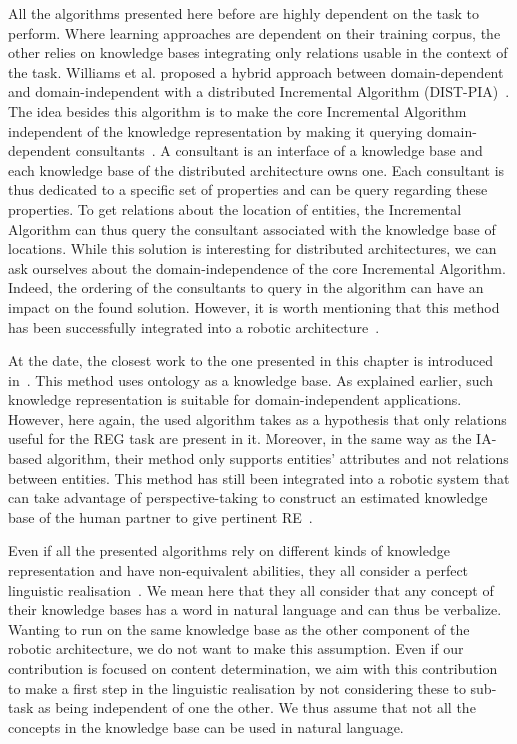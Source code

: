 All the algorithms presented here before are highly dependent on the task to perform. Where learning approaches are dependent on their training corpus, the other relies on knowledge bases integrating only relations usable in the context of the task. Williams et al. proposed a hybrid approach between domain-dependent and domain-independent with a distributed Incremental Algorithm (DIST-PIA)~\cite{williams_2017_referring}. The idea besides this algorithm is to make the core Incremental Algorithm independent of the knowledge representation by making it querying domain-dependent consultants~\cite{williams_2016_framework}. A consultant is an interface of a knowledge base and each knowledge base of the distributed architecture owns one. Each consultant is thus dedicated to a specific set of properties and can be query regarding these properties. To get relations about the location of entities, the Incremental Algorithm can thus query the consultant associated with the knowledge base of locations. While this solution is interesting for distributed architectures, we can ask ourselves about the domain-independence of the core Incremental Algorithm. Indeed, the ordering of the consultants to query in the algorithm can have an impact on the found solution. However, it is worth mentioning that this method has been successfully integrated into a robotic architecture~\cite{williams_2019_dempster}.

At the date, the closest work to the one presented in this chapter is introduced in~\cite{ros_2010_which}. This method uses ontology as a knowledge base. As explained earlier, such knowledge representation is suitable for domain-independent applications. However, here again, the used algorithm takes as a hypothesis that only relations useful for the REG task are present in it. Moreover, in the same way as the IA-based algorithm, their method only supports entities' attributes and not relations between entities. This method has still been integrated into a robotic system that can take advantage of perspective-taking to construct an estimated knowledge base of the human partner to give pertinent RE~\cite{lemaignan_2011_grounding}.

Even if all the presented algorithms rely on different kinds of knowledge representation and have non-equivalent abilities, they all consider a perfect linguistic realisation~\cite{krahmer_2012_computational}. We mean here that they all consider that any concept of their knowledge bases has a word in natural language and can thus be verbalize. Wanting to run on the same knowledge base as the other component of the robotic architecture, we do not want to make this assumption. Even if our contribution is focused on content determination, we aim with this contribution to make a first step in the linguistic realisation by not considering these to sub-task as being independent of one the other. We thus assume that not all the concepts in the knowledge base can be used in natural language.

